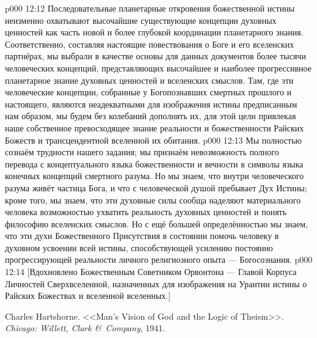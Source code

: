 \vs p000 12:12 Последовательные планетарные откровения божественной истины неизменно охватывают высочайшие существующие концепции духовных ценностей как часть новой и более глубокой координации планетарного знания. Соответственно, составляя настоящие повествования о Боге и его вселенских партнёрах, мы выбрали в качестве основы для данных документов более тысячи человеческих концепций, представляющих высочайшее и наиболее прогрессивное планетарное знание духовных ценностей и вселенских смыслов. Там, где эти человеческие концепции, собранные у Богопознавших смертных прошлого и настоящего, являются неадекватными для изображения истины предписанным нам образом, мы будем без колебаний дополнять их, для этой цели привлекая наше собственное превосходящее знание реальности и божественности Райских Божеств и трансцендентной вселенной их обитания.
\vs p000 12:13 Мы полностью сознаём трудности нашего задания; мы признаём невозможность полного перевода с концептуального языка божественности и вечности в символы языка конечных концепций смертного разума. Но мы знаем, что внутри человеческого разума живёт частица Бога, и что с человеческой душой пребывает Дух Истины; кроме того, мы знаем, что эти духовные силы сообща наделяют материального человека возможностью ухватить реальность духовных ценностей и понять философию вселенских смыслов. Но с ещё большей определённостью мы знаем, что эти духи Божественного Присутствия в состоянии помочь человеку в духовном усвоении всей истины, способствующей усилению постоянно прогрессирующей реальности личного религиозного опыта --- Богосознания.
\vsetoff
\vs p000 12:14 [Вдохновлено Божественным Советником Орвонтона --- Главой Корпуса Личностей Сверхвселенной, назначенных для изображения на Урантии истины о Райских Божествах и вселенной вселенных.]
\quizlink
\begin{thebibliography}{100}
Charles Hartshorne.
{<<Man's Vision of God and the Logic of Theism>>.}
{\em Chicago: Willett, Clark \&\ Company}, 1941.
\end{thebibliography}
